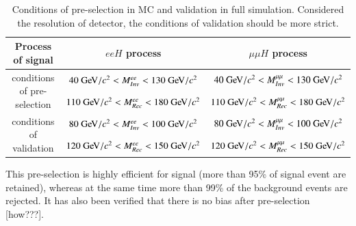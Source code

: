 \documentclass[11pt,a4paper]{cepcnote}
\begin{document}
\begin{table}[H]
\newcommand{\tabincell}[2]{\begin{tabular}{@{}#1@{}}#2\end{tabular}}
 \begin{center}
  \begin{tabular}{|c|c|c|}
  \hline \hline
  Process of signal				&		$eeH$ process						&				$\mu\mu H$ process\\
  \hline
  \multirow{2}{*}{conditions of pre-selection} 	&	$40\gev/c^2 < M_{Inv}^{ee} < 130\gev/c^2$&$40\gev/c^2 < M_{Inv}^{\mu\mu} < 130\gev/c^2$	\\
  											&	$110\gev/c^2 < M_{Rec}^{ee} < 180\gev/c^2$		&$110\gev/c^2 < M_{Rec}^{\mu\mu} < 180\gev/c^2$\\
  \hline
  \multirow{2}{*}{conditions of validation}	&	$80\gev/c^2 < M_{Inv}^{ee} < 100\gev/c^2$&$80\gev/c^2 < M_{Inv}^{\mu\mu} < 100\gev/c^2$	\\
  											&	$120\gev/c^2 < M_{Rec}^{ee} < 150\gev/c^2$		&$120\gev/c^2 < M_{Rec}^{\mu\mu} < 150\gev/c^2$\\
  \hline \hline
  \end{tabular}
  \caption[]{Conditions of pre-selection in MC and validation in full simulation. Considered the resolution of detector, the conditions of 
  validation should be more strict.}
  \label{tab:llhprecut}
 \end{center}
\end{table}
This pre-selection is highly efficient for signal (more than 95\% of signal event are retained), whereas at the same time
more than 99\% of the background events are rejected. It has also been verified that there is no bias after pre-selection
[how???].
\end{document}
